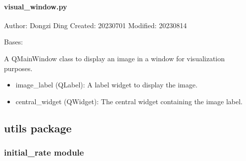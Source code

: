 \documentclass[a4paper,10pt,english]{sphinxmanual}
\begin{document}
\paragraph{visual\_window.py}
\label{\detokenize{gui:visual-window-py}}
\sphinxAtStartPar
Author: Dongzi Ding
Created: 2023\sphinxhyphen{}07\sphinxhyphen{}01
Modified: 2023\sphinxhyphen{}08\sphinxhyphen{}14

\begin{fulllineitems}
\label{\detokenize{gui:src.gui.visual_window.VisualWindow}}
\pysigstartsignatures
{}
\pysigstopsignatures
\sphinxAtStartPar
Bases: 

\sphinxAtStartPar
A QMainWindow class to display an image in a window for visualization purposes.
\begin{description}
\begin{itemize}
\item {} 
\sphinxAtStartPar
image\_label (QLabel): A label widget to display the image.

\item {} 
\sphinxAtStartPar
central\_widget (QWidget): The central widget containing the image label.

\end{itemize}

\end{description}

\end{fulllineitems}


\sphinxstepscope


\subsection{utils package}
\label{\detokenize{utils:module-src.utils}}\label{\detokenize{utils:utils-package}}\label{\detokenize{utils::doc}}

\subsubsection{initial\_rate module}
\label{\detokenize{utils:module-src.utils.initial_rate}}\label{\detokenize{utils:initial-rate-module}}
\end{document}

